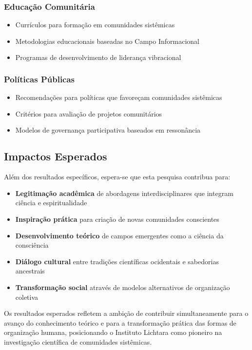 \subsubsection{Educação Comunitária}
\begin{itemize}
    \item Currículos para formação em comunidades sistêmicas
    \item Metodologias educacionais baseadas no Campo Informacional
    \item Programas de desenvolvimento de liderança vibracional
\end{itemize}

\subsubsection{Políticas Públicas}
\begin{itemize}
    \item Recomendações para políticas que favoreçam comunidades sistêmicas
    \item Critérios para avaliação de projetos comunitários
    \item Modelos de governança participativa baseados em ressonância
\end{itemize}

\subsection{Impactos Esperados}

Além dos resultados específicos, espera-se que esta pesquisa contribua para:

\begin{itemize}
    \item \textbf{Legitimação acadêmica} de abordagens interdisciplinares que integram ciência e espiritualidade
    \item \textbf{Inspiração prática} para criação de novas comunidades conscientes
    \item \textbf{Desenvolvimento teórico} de campos emergentes como a ciência da consciência
    \item \textbf{Diálogo cultural} entre tradições científicas ocidentais e sabedorias ancestrais
    \item \textbf{Transformação social} através de modelos alternativos de organização coletiva
\end{itemize}

Os resultados esperados refletem a ambição de contribuir simultaneamente para o avanço do conhecimento teórico e para a transformação prática das formas de organização humana, posicionando o Instituto Lichtara como pioneiro na investigação científica de comunidades sistêmicas.

\newpage
